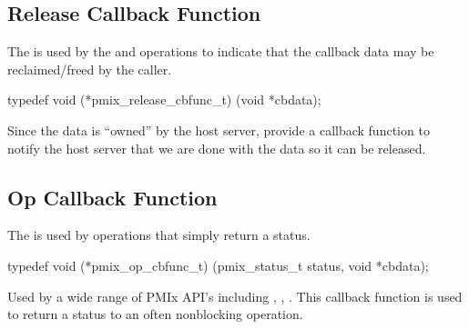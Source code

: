\subsection{Release Callback Function}

\summary

The  is used by the  and  operations to indicate that the callback data may be reclaimed/freed by the caller.

\format

\cspecificstart
\begin{codepar}
typedef void (*pmix_release_cbfunc_t)
    (void *cbdata);
\end{codepar}
\cspecificend

\begin{arglist}
\end{arglist}

\descr

Since the data is ``owned'' by the host server, provide a callback function to notify the host server that we are done with the data so it can be released.


\subsection{Op Callback Function}

\summary

The  is used by operations that simply return a status.

\cspecificstart
\begin{codepar}
typedef void (*pmix_op_cbfunc_t)
    (pmix_status_t status, void *cbdata);
\end{codepar}
\cspecificend

\begin{arglist}
\end{arglist}

\descr

Used by a wide range of \ac{PMIx} API's including , , .
This callback function is used to return a status to an often nonblocking operation.


